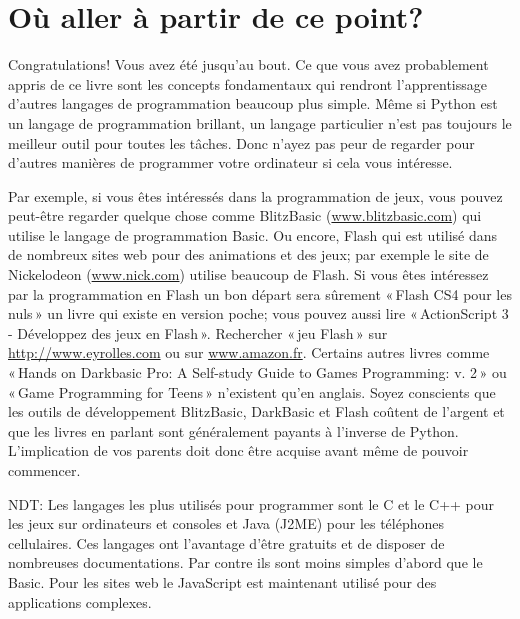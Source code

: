 


\chapter{Où aller à partir de ce point?}

Congratulations! Vous avez été jusqu'au bout. Ce que vous avez probablement appris de ce livre sont les concepts fondamentaux qui rendront l'apprentissage d'autres langages de programmation beaucoup plus simple. Même si Python est un langage de programmation brillant, un langage particulier n'est pas toujours le meilleur outil pour toutes les tâches. Donc n'ayez pas peur de regarder pour d'autres manières de programmer votre ordinateur si cela vous intéresse.

Par exemple, si vous êtes intéressés dans la programmation de jeux, vous pouvez peut-être regarder quelque chose comme BlitzBasic (\url{www.blitzbasic.com}) qui utilise le langage de programmation Basic. Ou encore, Flash qui est utilisé dans de nombreux sites web pour des animations et des jeux; par exemple le site de Nickelodeon (\url{www.nick.com}) utilise  beaucoup de Flash. Si vous êtes intéressez par la programmation en Flash un bon départ sera sûrement « Flash CS4 pour les nuls » un livre qui existe en version poche; vous pouvez aussi lire « ActionScript 3 - Développez des jeux en Flash ». Rechercher « jeu Flash » sur \url{http://www.eyrolles.com} ou sur \url{www.amazon.fr}. Certains autres livres comme « Hands on Darkbasic Pro: A Self-study Guide to Games Programming: v. 2 » ou « Game Programming for Teens » n'existent qu'en anglais.
Soyez conscients que les outils de développement BlitzBasic, DarkBasic et Flash coûtent de l'argent et que les livres en parlant sont généralement payants à l'inverse de Python. L'implication de vos parents doit donc être acquise avant même de pouvoir commencer.

NDT: Les langages les plus utilisés pour programmer sont le C et le C++ pour les jeux sur ordinateurs et consoles et Java (J2ME) pour les téléphones cellulaires. Ces langages ont l'avantage d'être gratuits et de disposer de nombreuses documentations. Par contre ils sont moins simples d'abord que le Basic. Pour les sites web le JavaScript est maintenant utilisé pour des applications complexes.

